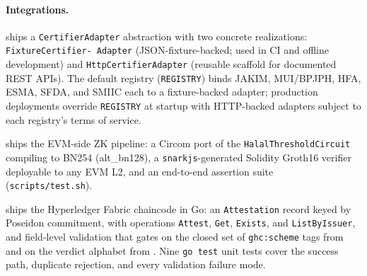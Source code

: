 \paragraph{Integrations.}
 ships a \texttt{CertifierAdapter}
abstraction with two concrete realizations: \texttt{FixtureCertifier-
Adapter} (JSON-fixture-backed; used in CI and offline development)
and \texttt{HttpCertifierAdapter} (reusable scaffold for
documented REST APIs). The default registry (\texttt{REGISTRY})
binds JAKIM, MUI/BPJPH, HFA, ESMA, SFDA, and SMIIC each to a
fixture-backed adapter; production deployments override
\texttt{REGISTRY} at startup with HTTP-backed adapters subject to
each registry's terms of service.

 ships the EVM-side ZK pipeline: a
Circom \cite{circom} port of the \texttt{HalalThresholdCircuit}
compiling to BN254 (alt\_bn128), a \texttt{snarkjs}-generated
Solidity Groth16 verifier deployable to any EVM L2, and an
end-to-end assertion suite (\texttt{scripts/test.sh}).

 ships the Hyperledger
Fabric \cite{fabric} chaincode in Go: an \texttt{Attestation}
record keyed by Poseidon commitment, with operations \texttt{Attest},
\texttt{Get}, \texttt{Exists}, and \texttt{ListByIssuer}, and
field-level validation that gates on the closed set of
\texttt{ghc:scheme} tags from  and on the
verdict alphabet from . Nine \texttt{go test} unit
tests cover the success path, duplicate rejection, and every
validation failure mode.
